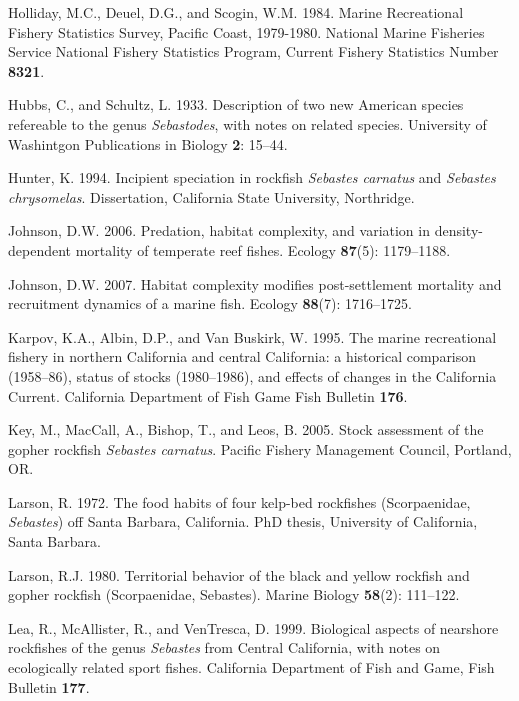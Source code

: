 \documentclass[12pt,]{article}
\begin{document}
\hypertarget{ref-Holliday1984}{}
Holliday, M.C., Deuel, D.G., and Scogin, W.M. 1984. Marine Recreational
Fishery Statistics Survey, Pacific Coast, 1979-1980. National Marine
Fisheries Service National Fishery Statistics Program, Current Fishery
Statistics Number \textbf{8321}.

\hypertarget{ref-Hubbs1933}{}
Hubbs, C., and Schultz, L. 1933. Description of two new American species
refereable to the genus \emph{Sebastodes}, with notes on related
species. University of Washintgon Publications in Biology \textbf{2}:
15--44.

\hypertarget{ref-Hunter1994}{}
Hunter, K. 1994. Incipient speciation in rockfish \emph{Sebastes
carnatus} and \emph{Sebastes chrysomelas}. Dissertation, California
State University, Northridge.

\hypertarget{ref-Johnson2006}{}
Johnson, D.W. 2006. Predation, habitat complexity, and variation in
density-dependent mortality of temperate reef fishes. Ecology
\textbf{87}(5): 1179--1188.

\hypertarget{ref-Johnson2007}{}
Johnson, D.W. 2007. Habitat complexity modifies post-settlement
mortality and recruitment dynamics of a marine fish. Ecology
\textbf{88}(7): 1716--1725.

\hypertarget{ref-Karpov1995}{}
Karpov, K.A., Albin, D.P., and Van Buskirk, W. 1995. The marine
recreational fishery in northern California and central California: a
historical comparison (1958--86), status of stocks (1980--1986), and
effects of changes in the California Current. California Department of
Fish Game Fish Bulletin \textbf{176}.

\hypertarget{ref-Key2005}{}
Key, M., MacCall, A., Bishop, T., and Leos, B. 2005. Stock assessment of
the gopher rockfish \emph{Sebastes carnatus}. Pacific Fishery Management
Council, Portland, OR.

\hypertarget{ref-Larson1972}{}
Larson, R. 1972. The food habits of four kelp-bed rockfishes
(Scorpaenidae, \emph{Sebastes}) off Santa Barbara, California.
PhD thesis, University of California, Santa Barbara.

\hypertarget{ref-Larson1980}{}
Larson, R.J. 1980. Territorial behavior of the black and yellow rockfish
and gopher rockfish (Scorpaenidae, Sebastes). Marine Biology
\textbf{58}(2): 111--122.

\hypertarget{ref-Lea1999}{}
Lea, R., McAllister, R., and VenTresca, D. 1999. Biological aspects of
nearshore rockfishes of the genus \emph{Sebastes} from Central
California, with notes on ecologically related sport fishes. California
Department of Fish and Game, Fish Bulletin \textbf{177}.
\end{document}
